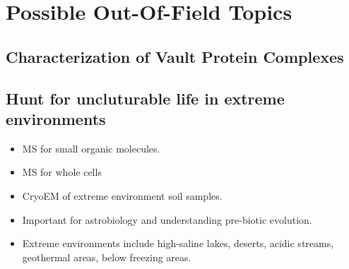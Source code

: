 


 
\section*{Possible Out-Of-Field Topics} 
\subsection*{Characterization of Vault Protein Complexes}
\subsection*{Hunt for uncluturable life in extreme environments} 
	\begin{itemize} 
		\item MS for small organic molecules.
		\item MS for whole cells 
		\item CryoEM of extreme environment soil samples.  
		\item Important for astrobiology and understanding pre-biotic evolution.  
		\item Extreme environments include high-saline lakes, deserts, acidic streams, geothermal areas, below freezing areas.
	\end{itemize} 


